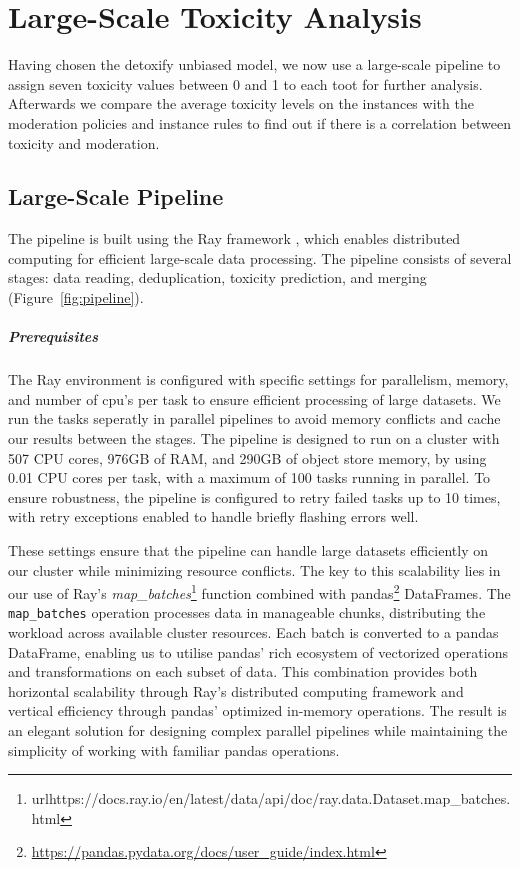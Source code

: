 \chapter{Large-Scale Toxicity Analysis} \label{large-scale-analysis}
Having chosen the detoxify unbiased model, we now use a large-scale pipeline to assign seven toxicity values between 0 and 1 to each toot for further analysis. Afterwards we compare the average toxicity levels on the instances with the moderation policies and instance rules to find out if there is a correlation between toxicity and moderation.

\section{Large-Scale Pipeline}
The pipeline is built using the Ray framework \cite{moritz:2018}, which enables distributed computing for efficient large-scale data processing. The pipeline consists of several stages: data reading, deduplication, toxicity prediction, and merging (Figure~\ref{fig:pipeline}).

\paragraph{Prerequisites}
The Ray environment is configured with specific settings for parallelism, memory, and number of cpu's per task to ensure efficient processing of large datasets. We run the tasks seperatly in parallel pipelines to avoid memory conflicts and cache our results between the stages. The pipeline is designed to run on a cluster with 507 CPU cores, 976GB of RAM, and 290GB of object store memory, by using 0.01 CPU cores per task, with a maximum of 100 tasks running in parallel. To ensure robustness, the pipeline is configured to retry failed tasks up to 10 times, with retry exceptions enabled to handle briefly flashing errors well.

These settings ensure that the pipeline can handle large datasets efficiently on our cluster while minimizing resource conflicts. The key to this scalability lies in our use of Ray's \textit{map\_batches}\footnote{url{https://docs.ray.io/en/latest/data/api/doc/ray.data.Dataset.map\_batches.html}} function combined with pandas\footnote{\url{https://pandas.pydata.org/docs/user\_guide/index.html}} DataFrames. The \texttt{map\_batches} operation processes data in manageable chunks, distributing the workload across available cluster resources. Each batch is converted to a pandas DataFrame, enabling us to utilise pandas' rich ecosystem of vectorized operations and transformations on each subset of data. This combination provides both horizontal scalability through Ray's distributed computing framework and vertical efficiency through pandas' optimized in-memory operations. The result is an elegant solution for designing complex parallel pipelines while maintaining the simplicity of working with familiar pandas operations.

